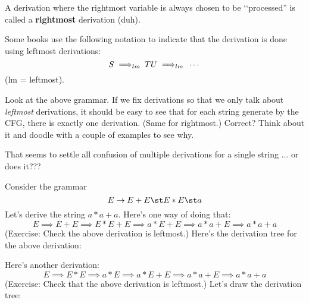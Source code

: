 A derivation where the rightmost variable is always chosen to 
be \lq\lq processed'' is called a \textbf{rightmost} derivation (duh).

Some books use the following notation to indicate that the 
derivation is done using leftmost derivations:
\[
S \implies_{\hskip-0.2cm lm}\,\,\, TU \implies_{\hskip-0.2cm lm}\,\,\, \cdots
\]
(lm = leftmost).

Look at the above grammar.
If we fix derivations so that we only talk about \textit{ leftmost} derivations,
it should be easy to see that for each string generate by the CFG, 
there is exactly one derivation. (Same for rightmost.)
Correct?
Think about it and doodle with a couple of examples to see why.

That seems to settle all confusion of multiple derivations for a 
single string ... or does it???

Consider the grammar
\[
E \rightarrow E+E \st E*E \st a
\]
Let's derive the string $a * a + a$.
Here's one way of doing that:
\[
E \implies E+E \implies E*E+E \implies a*E+E \implies a*a+E \implies a*a+a
\]
(Exercise: Check the above derivation is leftmost.)
Here's the derivation tree for the above derivation:

\begin{center}
\end{center}
    
Here's another derivation:
\[
E \implies E*E \implies a*E \implies a*E+E \implies a*a+E \implies a*a+a
\]
(Exercise: Check that the above derivation is leftmost.)
Let's draw the derivation tree:


